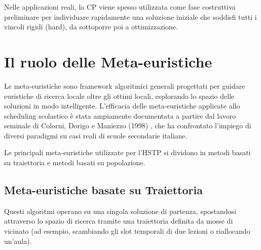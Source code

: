 Nelle applicazioni reali, la CP viene spesso utilizzata come fase costruttiva preliminare per individuare rapidamente una soluzione iniziale che soddisfi tutti i vincoli rigidi (hard), da sottoporre poi a ottimizzazione.

\section{Il ruolo delle Meta-euristiche}
\label{sec:ruolo-metaeuristiche}

Le meta-euristiche sono framework algoritmici generali progettati per guidare euristiche di ricerca locale oltre gli ottimi locali, esplorando lo spazio delle soluzioni in modo intelligente. L'efficacia delle meta-euristiche applicate allo scheduling scolastico è stata ampiamente documentata a partire dal lavoro seminale di Colorni, Dorigo e Maniezzo (1998) \cite{colorni1998metaheuristics}, che ha confrontato l'impiego di diversi paradigmi su casi reali di scuole secondarie italiane.

Le principali meta-euristiche utilizzate per l'HSTP si dividono in metodi basati su traiettoria e metodi basati su popolazione.

\subsection{Meta-euristiche basate su Traiettoria}
\label{subsec:metaeuristiche-traiettoria-cap2}

Questi algoritmi operano su una singola soluzione di partenza, spostandosi attraverso lo spazio di ricerca tramite una traiettoria definita da mosse di vicinato (ad esempio, scambiando gli slot temporali di due lezioni o riallocando un'aula).

